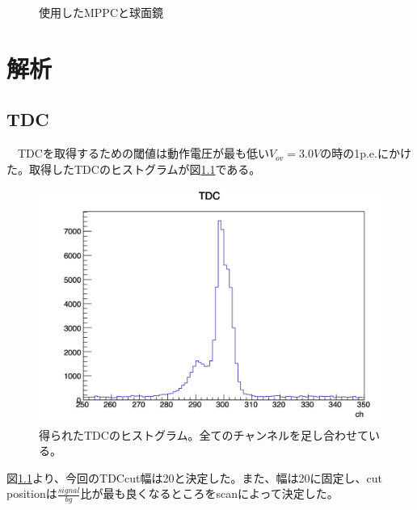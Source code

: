 \documentclass[uplatex, titlepage, dvipdfmx, 12pt, a4paper]{jsreport}
\begin{document}
\begin{figure}[htbp]
\begin{center}
\begin{tabular}{c}
    \end{tabular}
    \caption{使用したMPPCと球面鏡}
    \label{fig:MPPC'N'mirror}
  \end{center}
\end{figure}


\chapter{解析}
  \section{TDC}
  　TDCを取得するための閾値は動作電圧が最も低い$V_{ov}=3.0V$の時の1p.e.にかけた。取得したTDCのヒストグラムが図\ref{fig:tdc}である。
  \begin{figure}[htbp]
    \begin{center} 
      \includegraphics[clip, scale=0.3]{image/tdc.png}
      \caption{得られたTDCのヒストグラム。全てのチャンネルを足し合わせている。}
      \label{fig:tdc} 
    \end{center}
  \end{figure}
  図\ref{fig:tdc}より、今回のTDCcut幅は20と決定した。また、幅は20に固定し、cut positionは$\frac{signal}{bg}$比が最も良くなるところをscanによって決定した。
\end{document}
